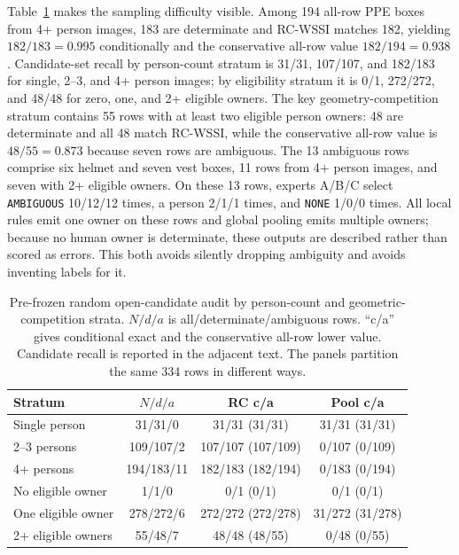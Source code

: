 \documentclass[iicol,pdflatex,sn-mathphys-num]{sn-jnl}
\begin{document}
Table~\ref{tab:randomauditstrata} makes the sampling difficulty visible. Among 194 all-row PPE boxes from 4+ person images, 183 are determinate and RC-WSSI matches 182, yielding $182/183=0.995$ conditionally and the conservative all-row value $182/194=0.938$. Candidate-set recall by person-count stratum is 31/31, 107/107, and 182/183 for single, 2--3, and 4+ person images; by eligibility stratum it is 0/1, 272/272, and 48/48 for zero, one, and 2+ eligible owners. The key geometry-competition stratum contains 55 rows with at least two eligible person owners: 48 are determinate and all 48 match RC-WSSI, while the conservative all-row value is $48/55=0.873$ because seven rows are ambiguous. The 13 ambiguous rows comprise six helmet and seven vest boxes, 11 rows from 4+ person images, and seven with 2+ eligible owners. On these 13 rows, experts A/B/C select \texttt{AMBIGUOUS} 10/12/12 times, a person 2/1/1 times, and \texttt{NONE} 1/0/0 times. All local rules emit one owner on these rows and global pooling emits multiple owners; because no human owner is determinate, these outputs are described rather than scored as errors. This both avoids silently dropping ambiguity and avoids inventing labels for it.

\begin{table}[t]
\caption{Pre-frozen random open-candidate audit by person-count and geometric-competition strata. $N/d/a$ is all/determinate/ambiguous rows. ``c/a'' gives conditional exact and the conservative all-row lower value. Candidate recall is reported in the adjacent text. The panels partition the same 334 rows in different ways.}
\label{tab:randomauditstrata}
\centering
\scriptsize
\setlength{\tabcolsep}{1.5pt}
\begin{tabular}{@{}l c c c@{}}
\toprule
Stratum & $N/d/a$ & RC c/a & Pool c/a \\
\midrule
Single person & 31/31/0 & 31/31 (31/31) & 31/31 (31/31) \\
2--3 persons & 109/107/2 & 107/107 (107/109) & 0/107 (0/109) \\
4+ persons & 194/183/11 & 182/183 (182/194) & 0/183 (0/194) \\
\midrule
No eligible owner & 1/1/0 & 0/1 (0/1) & 0/1 (0/1) \\
One eligible owner & 278/272/6 & 272/272 (272/278) & 31/272 (31/278) \\
2+ eligible owners & 55/48/7 & 48/48 (48/55) & 0/48 (0/55) \\
\bottomrule
\end{tabular}
\end{table}
\end{document}
